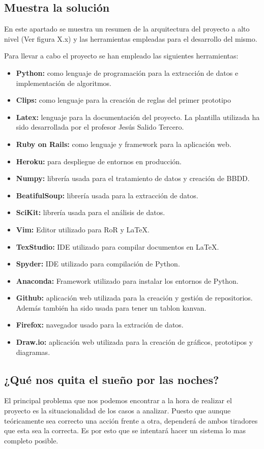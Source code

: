 \subsection{Muestra la solución}
En este apartado se muestra un resumen de la arquitectura del proyecto a alto nivel
(Ver figura X.x) y las herramientas empleadas para el desarrollo del mismo.

Para llevar a cabo el proyecto se han empleado las siguientes herramientas:
\begin{itemize}
  \item \textbf{Python:} como lenguaje de programación para la extracción de datos e implementación
    de algoritmos.
  \item \textbf{Clips:} como lenguaje para la creación de reglas del primer prototipo
  \item \textbf{Latex:} lenguaje para la documentación del proyecto. La plantilla utilizada
    ha sido desarrollada por el profesor Jesús Salido Tercero.
  \item \textbf{Ruby on Rails:} como lenguaje y framework para la aplicación web.
  \item \textbf{Heroku:} para despliegue de entornos en producción.
  \item \textbf{Numpy:} librería usada para el tratamiento de datos y creación de BBDD.
  \item \textbf{BeatifulSoup:} librería usada para la extracción de datos.
  \item \textbf{SciKit:} librería usada para el análisis de datos.
  \item \textbf{Vim:} Editor utilizado para RoR y LaTeX.
  \item \textbf{TexStudio:} IDE utilizado para compilar documentos en LaTeX.
  \item \textbf{Spyder:} IDE utilizado para compilación de Python.
  \item \textbf{Anaconda:} Framework utilizado para instalar los entornos de Python.
  \item \textbf{Github:} aplicación web utilizada para la creación y gestión de repositorios.
    Además también ha sido usada para tener un tablon kanvan.
  \item \textbf{Firefox:} navegador usado para la extración de datos.
  \item \textbf{Draw.io:} aplicación web utilizada para la creación de gráficos, prototipos
    y diagramas.
\end{itemize}

\subsection{¿Qué nos quita el sueño por las noches?}
El principal problema que nos podemos encontrar a la hora de realizar el proyecto
es la situacionalidad de los casos a analizar. Puesto que aunque teóricamente
sea correcto una acción frente a otra, dependerá de ambos tiradores que esta
sea la correcta. Es por esto que se intentará hacer un sistema lo mas completo posible.

